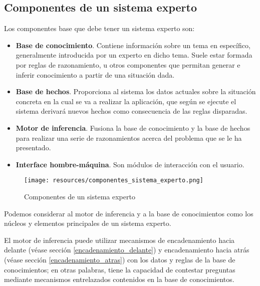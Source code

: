 \documentclass[a4paper, 11pt, titlepage]{article}
\begin{document}
    \subsection{Componentes de un sistema experto}

        Los componentes base que debe tener un sistema experto son:

        \begin{itemize}
            \item \textbf{Base de conocimiento}. Contiene información sobre un tema en específico, 
            generalmente introducida por un experto en dicho tema. Suele estar formada por reglas de 
            razonamiento, u otros componentes que permitan generar e inferir conocimiento a partir de 
            una situación dada.
            \item \textbf{Base de hechos}. Proporciona al sistema los datos actuales sobre la situación 
            concreta en la cual se va a realizar la aplicación, que según se ejecute el sistema derivará 
            nuevos hechos como consecuencia de las reglas disparadas.
            \item \textbf{Motor de inferencia}. Fusiona la base de conocimiento y la base de hechos para 
            realizar una serie de razonamientos acerca del problema que se le ha presentado.
            \item \textbf{Interface hombre-máquina}. Son módulos de interacción con el usuario.
        \end{itemize}

        \begin{figure}[htp]
            \centering
            \texttt{[image: resources/componentes\_sistema\_experto.png]}
            \caption{Componentes de un sistema experto}
            \label{componentes_sistema_experto}
        \end{figure}    

        Podemos considerar al motor de inferencia y a la base de conocimientos como los núcleos 
        y elementos principales de un sistema experto.

        El motor de inferencia puede utilizar mecanismos de encadenamiento hacia delante (véase sección 
        \ref{encadenamiento_delante}) y encadenamiento hacia atrás (véase sección \ref{encadenamiento_atras})
        con los datos y reglas de la base de conocimientos; en otras palabras, tiene la capacidad de 
        contestar preguntas mediante mecanismos entrelazados contenidos en la base de conocimientos.
\end{document}
